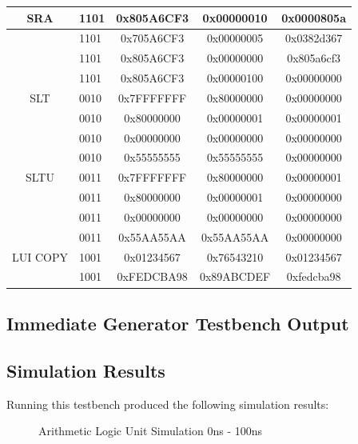 \documentclass[
    a4paper, %
	12pt, %
    ]{CSSullivanBusinessReport}
\begin{document}
\begin{fullwidth}
\begin{table}[H]
\begin{tabular}{|c||l|c|c|c|}
    \hline
    SRA&1101& 0x805A6CF3& 0x00000010&0x0000805a\\\hline
    &1101& 0x705A6CF3& 0x00000005&0x0382d367\\\hline
    &1101& 0x805A6CF3& 0x00000000&0x805a6cf3\\\hline
    &1101& 0x805A6CF3& 0x00000100&0x00000000\\\hline
    \hline
    SLT&0010& 0x7FFFFFFF& 0x80000000&0x00000000\\\hline
    &0010& 0x80000000& 0x00000001&0x00000001\\\hline
    &0010& 0x00000000& 0x00000000&0x00000000\\\hline
    &0010& 0x55555555& 0x55555555&0x00000000\\\hline
    \hline
    SLTU&0011& 0x7FFFFFFF& 0x80000000&0x00000001\\\hline
    &0011& 0x80000000& 0x00000001&0x00000000\\\hline
    &0011& 0x00000000& 0x00000000&0x00000000\\\hline
    &0011& 0x55AA55AA& 0x55AA55AA&0x00000000\\\hline
    \hline
    LUI COPY&1001& 0x01234567& 0x76543210&0x01234567\\\hline
    &1001& 0xFEDCBA98& 0x89ABCDEF&0xfedcba98\\\hline
    \end{tabular}
\end{table}

\newpage
\subsection{Immediate Generator Testbench Output} %


\newpage
\subsection{Simulation Results} %

Running this testbench produced the following simulation results:

\begin{figure}[H]
    \centering
    \captionsetup{style=widetable}
    \caption{Arithmetic Logic Unit Simulation 0ns - 100ns}
    \label{fig:ALUSim0}
\end{figure}


\end{fullwidth}
\end{document}
